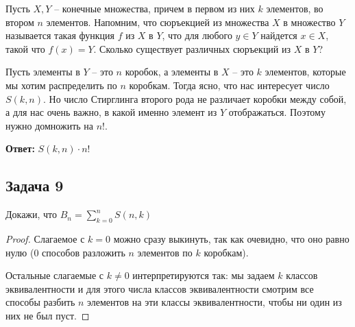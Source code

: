 Пусть $X, Y$ – конечные множества, причем в первом из них $k$ элементов, во втором $n$
элементов. Напомним, что сюръекцией из множества $X$ в множество $Y$ называется такая функция $f$ из $X$ в $Y$, что для любого $y \in Y$ найдется $x \in X$, такой что $f(x) = Y.$ Сколько существует различных сюръекций из $X$ в $Y$?

Пусть элементы в $Y$ -- это $n$ коробок, а элементы в $X$ -- это $k$ элементов, которые мы хотим распределить по $n$ коробкам. Тогда ясно, что нас интересует число $S(k, n)$. Но число Стирглинга второго рода не различает коробки между собой, а для нас очень важно, в какой именно элемент из $Y$ отображаться. Поэтому нужно домножить на $n!$.

\textbf{Ответ:} $S(k, n) \cdot n!$

\subsection{Задача 9}

Докажи, что $\displaystyle B_n = \sum_{k=0}^n{S(n,k)}$

\begin{proof}
Слагаемое с $k = 0$ можно сразу выкинуть, так как очевидно, что оно равно нулю (0 способов разложить $n$ элементов по $k$ коробкам).

Остальные слагаемые с $k \neq 0$ интерпретируются так: мы задаем $k$ классов эквивалентности и для этого числа классов эквивалентности смотрим все способы разбить $n$ элементов на эти классы эквивалентности, чтобы ни один из них не был пуст.
\end{proof}